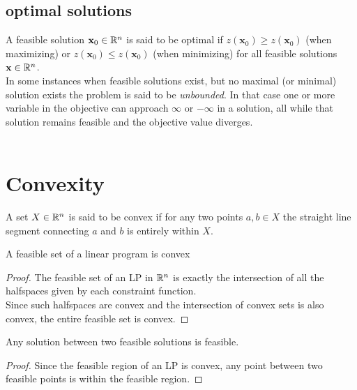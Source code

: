 \subsection{optimal solutions}
A feasible solution $\textbf{x}_0 \in \mathbb{R}^n$ is said to be optimal if $z(\textbf{x}_0) \geq z(\textbf{x}_0)$ (when maximizing) or $z(\textbf{x}_0) \leq z(\textbf{x}_0)$ (when minimizing) for all feasible solutions $\textbf{x} \in \mathbb{R}^n$.\\
In some instances when feasible solutions exist, but no maximal (or minimal) solution exists the problem is said to be \textit{unbounded}. In that case one or more variable in the objective can approach $\infty$ or $-\infty$ in a solution, all while that solution remains feasible and the objective value diverges.\\\\ 
\section{Convexity}
\begin{definition}\label{convex}
A set $X \in \mathbb{R}^n$ is said to be convex if for any two points $a, b \in X$ the straight line segment 
connecting $a$ and $b$ is entirely within $X$.
\end{definition}
\begin{theorem}
A feasible set of a linear program is convex
\begin{proof}
The feasible set of an LP in $\mathbb{R}^n$ is exactly the intersection of all the halfspaces given by each constraint function. \\
Since such halfspaces are convex and the intersection of convex sets is also convex, the entire feasible set is convex.
\end{proof}
\end{theorem}
\begin{lemma}
Any solution between two feasible solutions is feasible.
\begin{proof}
Since the feasible region of an LP is convex, any point between two feasible points is within the feasible region.
\end{proof}
\end{lemma}
